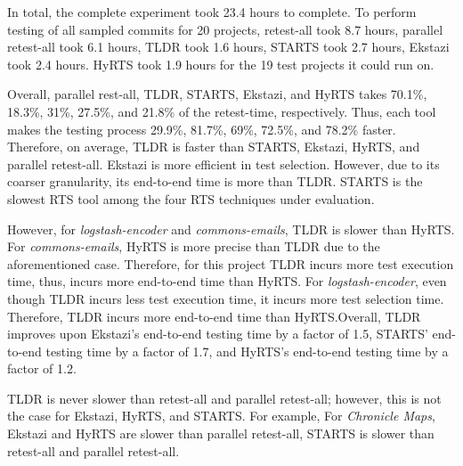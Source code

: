 

In total, the complete experiment took 23.4 hours to complete. To perform testing of all sampled commits for 20 projects, retest-all took 8.7 hours, parallel retest-all took 6.1 hours, TLDR took 1.6 hours, STARTS took 2.7 hours, Ekstazi took 2.4 hours. HyRTS took 1.9 hours for the 19 test projects it could run on.  

Overall, parallel rest-all, TLDR, STARTS, Ekstazi, and HyRTS takes 70.1\%, 18.3\%, 31\%, 27.5\%, and 21.8\% of the retest-time, respectively. Thus, each tool makes the testing process 29.9\%, 81.7\%, 69\%, 72.5\%, and 78.2\% faster. Therefore, on average, TLDR is faster than STARTS, Ekstazi, HyRTS, and parallel retest-all. Ekstazi is more efficient in test selection. However, due to its coarser granularity, its end-to-end time is more than TLDR. STARTS is the slowest RTS tool among the four RTS techniques under evaluation. 

However, for \textit{logstash-encoder} and \textit{commons-emails}, TLDR is slower than HyRTS. For \textit{commons-emails}, HyRTS is more precise than TLDR due to the aforementioned case. Therefore, for this project TLDR incurs more test execution time, thus, incurs more end-to-end time than HyRTS. For \textit{logstash-encoder}, even though TLDR incurs less test execution time, it incurs more test selection time. Therefore, TLDR incurs more end-to-end time than HyRTS.Overall, TLDR improves upon Ekstazi's end-to-end testing time by a factor of 1.5, STARTS' end-to-end testing time by a factor of 1.7, and HyRTS's end-to-end testing time by a factor of 1.2.

TLDR is never slower than retest-all and parallel retest-all; however, this is not the case for Ekstazi, HyRTS, and STARTS. For example, For \textit{Chronicle Maps}, Ekstazi and HyRTS are slower than parallel retest-all, STARTS is slower than retest-all and parallel retest-all.
